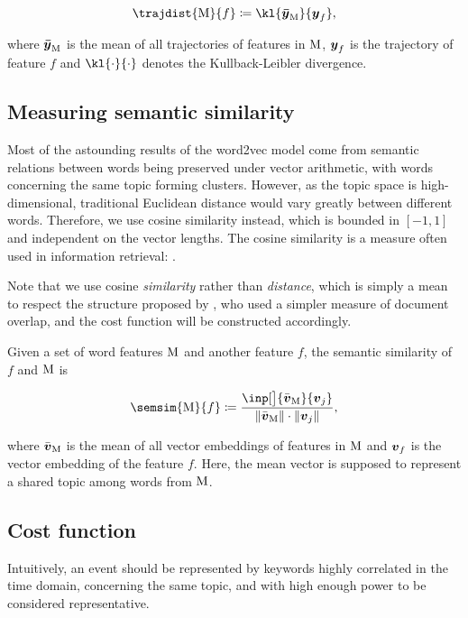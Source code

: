 \begin{equation}
	\trajdist{\featset}{f} \coloneqq \kl{\vect{\bar{\traj}}_{\featset}}{\vect{\traj}_{f}},
\end{equation}

where $\vect{\bar{\traj}}_{\featset}$ is the mean of all trajectories of features in $\text{M}$, $\vect{\traj}_{f}$ is the trajectory of feature $f$ and $\kl{\cdot}{\cdot}$ denotes the Kullback-Leibler divergence.


\subsection{Measuring semantic similarity}
Most of the astounding results of the word2vec model come from semantic relations between words being preserved under vector arithmetic, with words concerning the same topic forming clusters. However, as the topic space is high-dimensional, traditional Euclidean distance would vary greatly between different words. Therefore, we use cosine similarity instead, which is bounded in $[-1, 1]$ and independent on the vector lengths. The cosine similarity is a measure often used in information retrieval: \cite{cosine-similarity-i, cosine-similarity-ii}.

Note that we use cosine \textit{similarity} rather than \textit{distance}, which is simply a mean to respect the structure proposed by \cite{event-detection}, who used a simpler measure of document overlap, and the cost function will be constructed accordingly.

Given a set of word features $\text{M}$ and another feature $f$, the semantic similarity of $f$ and $\text{M}$ is

\begin{equation}
	\semsim{\featset}{f} \coloneqq \frac{\inp[\big]{\bar{\embed}_{\featset}}{\embed_{j}}}{\| \bar{\embed}_{\featset} \| \cdot \| \embed_{j} \|},
\end{equation}

where $\bar{\embed}_{\featset}$ is the mean of all vector embeddings of features in $\text{M}$ and $\embed_{f}$ is the vector embedding of the feature $f$. Here, the mean vector is supposed to represent a shared topic among words from $\text{M}$.


\subsection{Cost function}
Intuitively, an event should be represented by keywords highly correlated in the time domain, concerning the same topic, and with high enough power to be considered representative.

